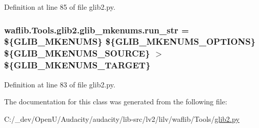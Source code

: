 Definition at line 85 of file glib2.\+py.

\subsubsection[{\texorpdfstring{run\+\_\+str}{run_str}}]{ waflib.\+Tools.\+glib2.\+glib\+\_\+mkenums.\+run\+\_\+str = \textquotesingle{}\$\{G\+L\+I\+B\+\_\+\+M\+K\+E\+N\+U\+MS\} \$\{G\+L\+I\+B\+\_\+\+M\+K\+E\+N\+U\+M\+S\+\_\+\+O\+P\+T\+I\+O\+NS\} \$\{G\+L\+I\+B\+\_\+\+M\+K\+E\+N\+U\+M\+S\+\_\+\+S\+O\+U\+R\+CE\} $>$ \$\{G\+L\+I\+B\+\_\+\+M\+K\+E\+N\+U\+M\+S\+\_\+\+T\+A\+R\+G\+ET\}\textquotesingle{}\hspace{0.3cm}{\ttfamily [static]}}\hypertarget{classwaflib_1_1_tools_1_1glib2_1_1glib__mkenums_a1fc98d38fffa786e04b95e6f1cd2e63a}{}\label{classwaflib_1_1_tools_1_1glib2_1_1glib__mkenums_a1fc98d38fffa786e04b95e6f1cd2e63a}


Definition at line 83 of file glib2.\+py.



The documentation for this class was generated from the following file\+:\begin{DoxyCompactItemize}
\item 
C\+:/\+\_\+dev/\+Open\+U/\+Audacity/audacity/lib-\/src/lv2/lilv/waflib/\+Tools/\hyperlink{lilv_2waflib_2_tools_2glib2_8py}{glib2.\+py}\end{DoxyCompactItemize}
